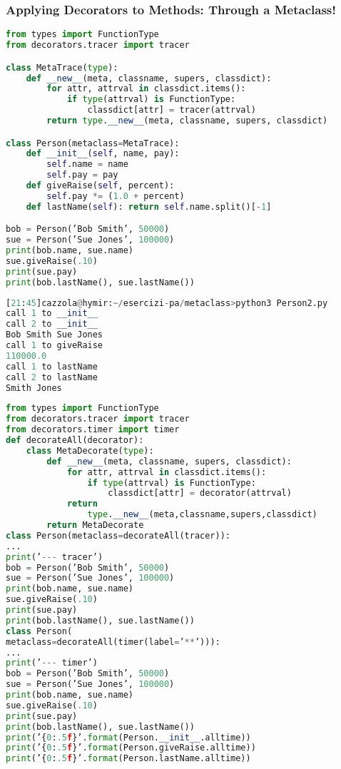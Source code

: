 \subsubsection{Applying Decorators to Methods: Through a Metaclass!}

\begin{lstlisting}[language=Python]
from types import FunctionType
from decorators.tracer import tracer

class MetaTrace(type):
	def __new__(meta, classname, supers, classdict):
		for attr, attrval in classdict.items():
			if type(attrval) is FunctionType:
				classdict[attr] = tracer(attrval)
		return type.__new__(meta, classname, supers, classdict)

class Person(metaclass=MetaTrace):
	def __init__(self, name, pay):
		self.name = name
		self.pay = pay
	def giveRaise(self, percent):
		self.pay *= (1.0 + percent)
	def lastName(self): return self.name.split()[-1]

bob = Person(’Bob Smith’, 50000)
sue = Person(’Sue Jones’, 100000)
print(bob.name, sue.name)
sue.giveRaise(.10)
print(sue.pay)
print(bob.lastName(), sue.lastName())
\end{lstlisting}

\begin{lstlisting}[language=Python]
[21:45]cazzola@hymir:~/esercizi-pa/metaclass>python3 Person2.py
call 1 to __init__
call 2 to __init__
Bob Smith Sue Jones
call 1 to giveRaise
110000.0
call 1 to lastName
call 2 to lastName
Smith Jones
\end{lstlisting}

\begin{lstlisting}[language=Python]
from types import FunctionType
from decorators.tracer import tracer
from decorators.timer import timer
def decorateAll(decorator):
	class MetaDecorate(type):
		def __new__(meta, classname, supers, classdict):
			for attr, attrval in classdict.items():
				if type(attrval) is FunctionType:
					classdict[attr] = decorator(attrval)
			return
				type.__new__(meta,classname,supers,classdict)
		return MetaDecorate
class Person(metaclass=decorateAll(tracer)):
...
print(’--- tracer’)
bob = Person(’Bob Smith’, 50000)
sue = Person(’Sue Jones’, 100000)
print(bob.name, sue.name)
sue.giveRaise(.10)
print(sue.pay)
print(bob.lastName(), sue.lastName())
class Person(
metaclass=decorateAll(timer(label=’**’))):
...
print(’--- timer’)
bob = Person(’Bob Smith’, 50000)
sue = Person(’Sue Jones’, 100000)
print(bob.name, sue.name)
sue.giveRaise(.10)
print(sue.pay)
print(bob.lastName(), sue.lastName())
print(’{0:.5f}’.format(Person.__init__.alltime))
print(’{0:.5f}’.format(Person.giveRaise.alltime))
print(’{0:.5f}’.format(Person.lastName.alltime))
\end{lstlisting}

